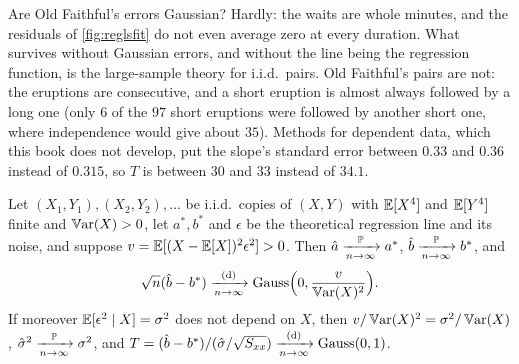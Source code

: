 Are Old Faithful's errors Gaussian?
Hardly: the waits are whole minutes, and the residuals of \cref{fig:reglsfit} do not even average zero at every duration.
What survives without Gaussian errors, and without the line being the regression function, is the large-sample theory for i.i.d.\ pairs. Old Faithful's pairs are not: the eruptions are consecutive, and a short eruption is almost always followed by a long one (only $6$ of the $97$ short eruptions were followed by another short one, where independence would give about $35$). Methods for dependent data, which this book does not develop, put the slope's standard error between $0.33$ and $0.36$ instead of $0.315$, so $T$ is between $30$ and $33$ instead of $34.1$.

\begin{theorem}
\label{thm:lse-asymptotic}
Let $(X_1, Y_1), (X_2, Y_2), \ldots$ be i.i.d.\ copies of $(X, Y)$ with $\operatorname*{\mathbb{E}}[X^4]$ and $\operatorname*{\mathbb{E}}[Y^4]$ finite and $\operatorname*{\mathbb{V}\text{ar}}(X) > 0$, let $a^*, b^*$ and $\epsilon$ be the theoretical regression line and its noise, and suppose $v = \operatorname*{\mathbb{E}}[(X - \operatorname*{\mathbb{E}}[X])^2\epsilon^2] > 0$.
Then $\hat{a} \xrightarrow [n \to \infty ]{\mathbb{P}} a^*$, $\hat{b} \xrightarrow [n \to \infty ]{\mathbb{P}} b^*$, and
\[
\sqrt{n}(\hat{b} - b^*) \xrightarrow [n \to \infty ]{\text{(d)}} \text{Gauss}\Big(0, \frac{v}{\operatorname*{\mathbb{V}\text{ar}}(X)^2}\Big).
\]
If moreover $\operatorname*{\mathbb{E}}[\epsilon^2 \mid X] = \sigma^2$ does not depend on $X$, then $v/\operatorname*{\mathbb{V}\text{ar}}(X)^2 = \sigma^2/\operatorname*{\mathbb{V}\text{ar}}(X)$, $\hat{\sigma}^2 \xrightarrow [n \to \infty ]{\mathbb{P}} \sigma^2$, and $T = (\hat{b} - b^*)/(\hat{\sigma}/\sqrt{S_{xx}}) \xrightarrow [n \to \infty ]{\text{(d)}} \text{Gauss}(0, 1)$.
\end{theorem}
